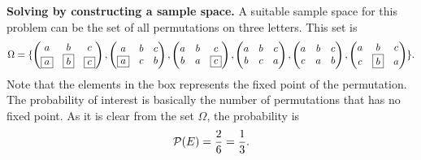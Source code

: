 \begin{solution}
		\textbf{Solving by constructing a sample space.} A suitable sample space for this problem can be the set of all permutations on three letters. This set is
		\[ \Omega = 
		\{\begin{pmatrix}
				a & b & c \\
				\boxed{a} & \boxed{b} & \boxed{c}
		\end{pmatrix},
		\begin{pmatrix}
			a & b & c \\
			\boxed{a} & c & b
		\end{pmatrix},
		\begin{pmatrix}
			a & b & c \\
			b & a & \boxed{c}
		\end{pmatrix},
		\begin{pmatrix}
			a & b & c \\
			b & c & a
		\end{pmatrix},
		\begin{pmatrix}
			a & b & c \\
			c & a & b
		\end{pmatrix},
		\begin{pmatrix}
			a & b & c \\
			c & \boxed{b} & a
		\end{pmatrix}\}.
	\]
	Note that the elements in the box represents the fixed point of the permutation. The probability of interest is basically the number of permutations that has no fixed point. As it is clear from the set $\Omega$, the probability is
	\[ \mathcal{P}(E) = \frac{2}{6} = \frac{1}{3}. \]
	\end{solution}
